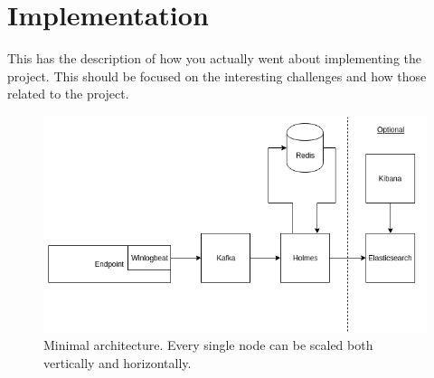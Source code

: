 \chapter{Implementation}
\label{chap:implementation}
This has the description of how you actually went about implementing the project.  This should be focused on the interesting challenges and how those related to the project.


\begin{figure}[h]  %
  \centering
  \includegraphics[width=.85\textwidth]{figures/holmes-architecture}
  \caption[An example figure.]{Minimal architecture. Every single node can be scaled both vertically and horizontally.}
  \label{fig:example}
\end{figure}